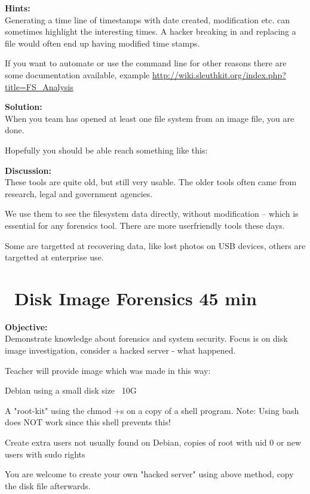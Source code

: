 \documentclass[a4paper,11pt,notitlepage]{report}
\begin{document}
{\bf Hints:}\\
Generating a time line of timestamps with date created, modification etc. can sometimes highlight the interesting times. A hacker breaking in and replacing a file would often end up having modified time stamps.

If you want to automate or use the command line for other reasons there are some documentation available, example \url{http://wiki.sleuthkit.org/index.php?title=FS_Analysis}

{\bf Solution:}\\
When you team has opened at least one file system from an image file, you are done.

Hopefully you should be able reach something like this:

{\bf Discussion:}\\
These tools are quite old, but still very usable. The older tools often came from research, legal and government agencies.

We use them to see the filesystem data directly, without modification -- which is essential for any forensics tool. There are more userfriendly tools these days.

Some are targetted at recovering data, like lost photos on USB devices, others are targetted at enterprise use.

\chapter{\faInfoCircle\  Disk Image Forensics 45 min}
\label{ex:disk-image-forensics}

{\bf Objective:}\\
Demonstrate knowledge about forensics and system security. Focus is on disk image investigation, consider a hacked server - what happened.

Teacher will provide image which was made in this way:
\begin{list2}
\item Debian using a small disk size ~10G
\item A "root-kit" using the chmod +s on a copy of a shell program. Note: Using bash does NOT work since this shell prevents this!
\item Create extra users not usually found on Debian, copies of root with uid 0 or new users with sudo rights
\end{list2}

You are welcome to create your own "hacked server" using above method, copy the disk file afterwards.
\end{document}
